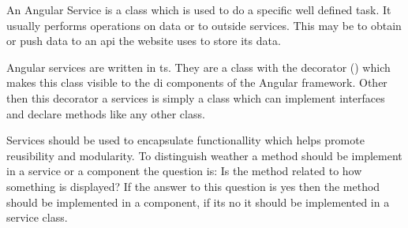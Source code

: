 
\cite{angularTemplateSyntax}




An Angular Service is a class which is used to do a specific well defined task. It usually performs operations on data or  to outside services. This may be to obtain or push data to an \gls{api} the website uses to store its data.


Angular services are written in \gls{ts}. They are a class with the  decorator () which makes this class visible to the \gls{di} components of the Angular framework. Other then this decorator a services is simply a class which can implement interfaces and declare methods like any other class.

Services should be used to encapsulate functionallity which helps promote reusibility and modularity. To distinguish weather a method should be implement in a service or a component the question is: Is the method related to how something is displayed? If the answer to this question is yes then the method should be implemented in a component, if its no it should be implemented in a service class.


